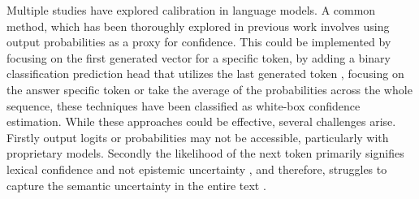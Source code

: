 



Multiple studies have explored calibration in language models. A common method, which has been thoroughly explored in previous work \citep{Calibration_Logits,Calibration_Logits_LLMs} involves using output probabilities as a proxy for confidence. This could be implemented by focusing on the first generated vector for a specific token, by adding a binary classification prediction head that utilizes the last generated token \citep{Language_Models_Mostly_Know}, focusing on the answer specific token or take the average of the probabilities across the whole sequence, these techniques have been classified as white-box confidence estimation. While these approaches could be effective, several challenges arise. Firstly output logits or probabilities may not be accessible, particularly with proprietary models. Secondly the likelihood of the next token primarily signifies lexical confidence and not epistemic uncertainty \citep{Epistetic_Uncertenty}, and therefore, struggles to capture the semantic uncertainty in the entire text \citep{Confidence_Elicitation}. 

